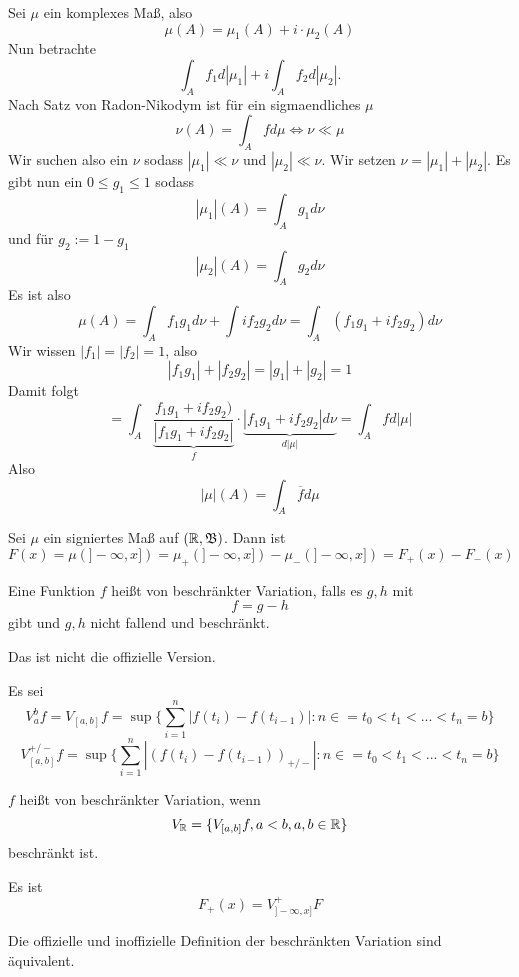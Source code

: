 	\begin{bsp}
		Sei $\mu$ ein komplexes Maß, also
		\[ \mu(A)=\mu_1(A)+i\cdot \mu_2(A) \]
		Nun betrachte
		\[ \int_A f_1 d|\mu_1|+i\int_A f_2 d|\mu_2|. \]
		Nach Satz von Radon-Nikodym ist für ein sigmaendliches $\mu$
		\[ \nu(A)=\int_A f d\mu\Leftrightarrow \nu \ll \mu \]
		Wir suchen also ein $\nu$ sodass $|\mu_1|\ll \nu$ und $|\mu_2|\ll \nu$. Wir setzen $\nu=|\mu_1|+|\mu_2|$. Es gibt nun ein $0\le g_1\le 1$ sodass
		\[ |\mu_1|(A)=\int_A g_1d\nu \]
		und für $g_2:=1-g_1$
		\[ |\mu_2|(A)=\int_A g_2d\nu \]
		Es ist also
		\[ \mu(A)=\int_A f_1g_1 d\nu +\int if_2 g_2d\nu = \int_A (f_1g_1+if_2g_2)d\nu \]
		Wir wissen $|f_1|=|f_2|=1$, also
		\[ |f_1g_1|+|f_2g_2|=|g_1|+|g_2|=1 \]
		Damit folgt
		\[ =\int_A \underbrace{\frac{f_1g_1+if_2g_2)}{|f_1g_1+if_2g_2|}}_f\cdot \underbrace{|f_1g_1+if_2g_2|d\nu}_{d|\mu|}=\int_A fd|\mu| \]
		Also
		\[ |\mu|(A)=\int_A \overline{f}d\mu \]
	\end{bsp}

	\begin{bsp}
		Sei $\mu$ ein signiertes Maß auf $(\mathbb{R}, \mathfrak{B})$. Dann ist
		\[ F(x)=\mu(]-\infty,x])=\mu_+(]-\infty,x])-\mu_-(]-\infty,x])=F_+(x)-F_-(x) \]
	\end{bsp}

	\begin{defi}
		Eine Funktion $f$ heißt von beschränkter Variation, falls es $g,h$ mit
		\[ f=g-h \]
		gibt und $g,h$ nicht fallend und beschränkt. 
	\end{defi}

	\begin{bem}
		Das ist nicht die offizielle Version. 
	\end{bem}

	\begin{defi}
		Es sei
		\[ V_a^b f=V_{[a,b]} f=\sup\{\sum_{i=1}^n|f(t_i)-f(t_{i-1})|: n\in =t_0<t_1<...<t_n=b\} \]
		\[V^{+/-}_{[a,b]} f=\sup\{\sum_{i=1}^n|(f(t_i)-f(t_{i-1}))_{+/-}|: n\in =t_0<t_1<...<t_n=b\} \]
	\end{defi}

	\begin{defi}[offiziell]
		$f$ heißt von beschränkter Variation, wenn
		\[ V_{\mathbb{R}}=\{V_{[a,b]} f, a<b, a,b\in\mathbb{R}\} \]
		beschränkt ist. 
	\end{defi}

	\begin{defi}
		Es ist
		\[ F_+(x)=V_{]-\infty,x]}^+ F \]
	\end{defi}

	\begin{satz}
		Die offizielle und inoffizielle Definition der beschränkten Variation sind äquivalent. 
	\end{satz}

